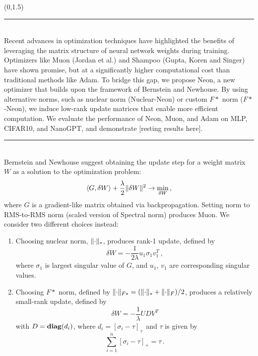 \documentclass[a0]{a0poster}
\def\Head#1{\noindent{\LARGE\color{bluegray} #1}\bigskip}
\begin{document}
\begin{textblock}{7.0}(0,1.5)

\hrule\medskip
\Head{Introduction}\\
Recent advances in optimization techniques have highlighted the benefits of leveraging the matrix structure of neural network weights during training. Optimizers like Muon (Jordan et al.) and Shampoo (Gupta, Koren and Singer) have shown promise, but at a significantly higher computational cost than traditional methods like Adam. To bridge this gap, we propose Neon, a new optimizer that builds upon the framework of Bernstein and Newhouse. By using alternative norms, such as nuclear norm (Nuclear-Neon) or custom $F*$ norm ($F*$-Neon), we induce low-rank update matrices that enable more efficient computation. We evaluate the performance of Neon, Muon, and Adam on MLP, CIFAR10, and NanoGPT, and demonstrate [resting results here].

\medskip
\hrule\medskip
\Head{Neon's update rule}\\
Bernstein and Newhouse suggest obtaining the update step for a weight matrix $W$ as a solution to the optimization problem:
\begin{equation}
    \langle G, \delta W \rangle + \frac{\lambda}{2} \Vert{\delta W}\Vert^2 \to \min_{\delta W}\,,
\end{equation}
where $G$ is a gradient-like matrix obtained via backpropagation. Setting norm to RMS-to-RMS norm (scaled version of Spectral norm) produces Muon. We consider two different choices instead:
\begin{enumerate}
    \item Choosing nuclear norm, $\Vert{\cdot}\Vert_*$, produces rank-1 update, defined by 
    \begin{equation}\label{eqn:update_star}
        \delta W = -\frac{1}{2\lambda} u_1 \sigma_1 v_1^T\,,
    \end{equation}
    where $\sigma_1$ is largest singular value of $G$, and $u_1$, $v_1$ are corresponding singular values.

    \item Choosing $F*$ norm, defined by $\Vert{\cdot}\Vert_{F*} = (\Vert{\cdot}\Vert_{*} + \Vert{\cdot}\Vert_{F})/2$, produces a relatively small-rank update, defined by
    \begin{equation}\label{eqn:update_F_star}
    \delta W = -\frac{1}{\lambda}UDV^T
    \end{equation} 
    with $D = \mathop{\bf diag}(d_i)$, where $d_i = [\sigma_i - \tau]_+$ and $\tau$ is given by
    \begin{equation*}
        \sum_{i=1}^n [\sigma_i - \tau]_+ = \tau\,.
    \end{equation*}
\end{enumerate}


\end{textblock}
\end{document}
